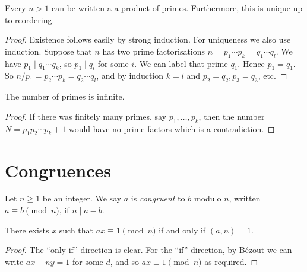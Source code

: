 \documentclass[a4paper, 10pt]{amsart}
\begin{document}
\begin{theorem} 
  Every $n>1$ can be written a a product of primes. Furthermore, this is unique up to reordering.
\end{theorem}
\begin{proof}
  Existence follows easily by strong induction. For uniqueness we also use induction. Suppose that $n$ has two prime factorisations $n=p_1 \cdots p_k=q_1 \cdots q_l$. We have $p_1 \mid q_1 \cdots q_k$, so $p_1 \mid q_i$ for some $i$. We can label that prime $q_1$. Hence $p_1=q_1$. So $n / p_1=p_2 \cdots p_k=q_2 \cdots q_l$, and by induction $k=l$ and $p_2=q_2, p_3=q_3$, etc.
\end{proof}


\begin{theorem}[Euclid]
    The number of primes is infinite.
\end{theorem}
\begin{proof}
  If there was finitely many primes, say $p_1, \dots, p_k$, then the number $N = p_1 p_2 \cdots p_k + 1$ would have no prime factors which is a contradiction.
\end{proof}

\section{Congruences}

\begin{definition}
Let $n \geq 1$ be an integer. We say $a$ is \emph{congruent} to $b$ modulo $n$, written $a \equiv b \pmod{n}$, if $n \mid a - b$.
\end{definition}

\begin{theorem}
  There exists $x$ such that $ax \equiv 1 \pmod{n}$ if and only if $(a, n) = 1$.
\end{theorem}
\begin{proof}
    The ``only if'' direction is clear. For the ``if'' direction, by Bézout we can write $ax + ny = 1$ for some $d$, and so $ax \equiv 1 \pmod{n}$ as required.
\end{proof}
\end{document}
